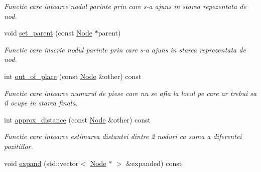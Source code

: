 \begin{DoxyCompactItemize}
\begin{DoxyCompactList}\small\item\em Functie care intoarce nodul parinte prin care s-\/a ajuns in starea repezentata de nod. \item\end{DoxyCompactList}\item 
\hypertarget{classNode_a85d2f936141b11c283ebfb6e2ba3c4d4}{
void \hyperlink{classNode_a85d2f936141b11c283ebfb6e2ba3c4d4}{set\_\-parent} (const \hyperlink{classNode}{Node} $\ast$parent)}
\label{classNode_a85d2f936141b11c283ebfb6e2ba3c4d4}

\begin{DoxyCompactList}\small\item\em Functie care inscrie nodul parinte prin care s-\/a ajuns in starea reprezentata de nod. \item\end{DoxyCompactList}\item 
\hypertarget{classNode_afff505e516a56aff71078703f6dcff54}{
int \hyperlink{classNode_afff505e516a56aff71078703f6dcff54}{out\_\-of\_\-place} (const \hyperlink{classNode}{Node} \&other) const }
\label{classNode_afff505e516a56aff71078703f6dcff54}

\begin{DoxyCompactList}\small\item\em Functie care intoarce numarul de piese care nu se afla la locul pe care ar trebui sa il ocupe in starea finala. \item\end{DoxyCompactList}\item 
\hypertarget{classNode_a487d897836ff22b0932e762db41b1d85}{
int \hyperlink{classNode_a487d897836ff22b0932e762db41b1d85}{approx\_\-distance} (const \hyperlink{classNode}{Node} \&other) const }
\label{classNode_a487d897836ff22b0932e762db41b1d85}

\begin{DoxyCompactList}\small\item\em Functie care intoarce estimarea distantei dintre 2 noduri ca suma a diferentei pozitiilor. \item\end{DoxyCompactList}\item 
\hypertarget{classNode_aadf864009ae1cc1adb8aa8a3807ab428}{
void \hyperlink{classNode_aadf864009ae1cc1adb8aa8a3807ab428}{expand} (std::vector$<$ \hyperlink{classNode}{Node} $\ast$ $>$ \&expanded) const }
\label{classNode_aadf864009ae1cc1adb8aa8a3807ab428}


\end{DoxyCompactItemize}
